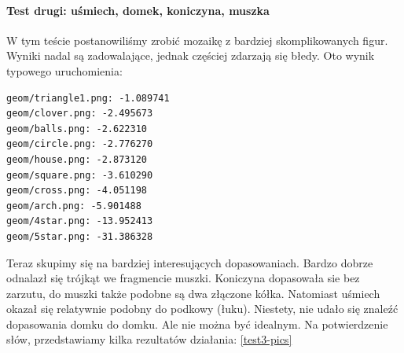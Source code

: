 \documentclass[a4paper,12pt,leqno]{article}
\begin{document}
\paragraph{Test drugi: uśmiech, domek, koniczyna, muszka}
W tym teście postanowiliśmy zrobić mozaikę z bardziej skomplikowanych figur. Wyniki nadal są zadowalające, jednak częściej zdarzają się błedy.
Oto wynik typowego uruchomienia:
\begin{verbatim}
geom/triangle1.png: -1.089741
geom/clover.png: -2.495673
geom/balls.png: -2.622310
geom/circle.png: -2.776270
geom/house.png: -2.873120
geom/square.png: -3.610290
geom/cross.png: -4.051198
geom/arch.png: -5.901488
geom/4star.png: -13.952413
geom/5star.png: -31.386328
\end{verbatim}
Teraz skupimy się na bardziej interesujących dopasowaniach.
Bardzo dobrze odnalazł się trójkąt we fragmencie muszki. Koniczyna dopasowała sie bez zarzutu, do muszki także podobne są dwa złączone kółka.
Natomiast uśmiech okazał się relatywnie podobny do podkowy (łuku). Niestety, nie udało się znaleźć dopasowania domku do domku. 
Ale nie można być idealnym. Na potwierdzenie słów, przedstawiamy kilka rezultatów działania: \ref{test3-pics}
\end{document}
